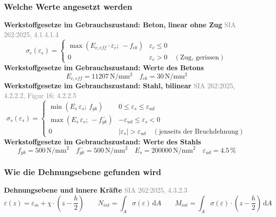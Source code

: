 \documentclass[11pt,a4paper]{article}
\newcommand{\normref}[1]{{\small\textcolor{gray}{#1}}}
\begin{document}
\subsubsection{Welche Werte angesetzt werden}
\noindent\textbf{Werkstoffgesetze im Gebrauchszustand: Beton, linear ohne Zug} \hfill \normref{SIA 262:2025, 4.1.4.1.4}
\begin{equation*}
\sigma_c(\varepsilon_c) = \begin{cases} \max\left(E_{c,eff} \cdot \varepsilon_c;\ -f_{ck}\right) & \varepsilon_c \le 0 \\[1ex] 0 & \varepsilon_c > 0 \quad (\text{Zug, gerissen}) \end{cases}
\end{equation*}
\noindent\textbf{Werkstoffgesetze im Gebrauchszustand: Werte des Betons}
\begin{equation*}
E_{c,eff} = 11207\,\mathrm{N}/\mathrm{mm}^{2} \quad f_{ck} = 30\,\mathrm{N}/\mathrm{mm}^{2}
\end{equation*}
\noindent\textbf{Werkstoffgesetze im Gebrauchszustand: Stahl, bilinear} \hfill \normref{SIA 262:2025, 4.2.2.2, Figur 16; 4.2.2.5}
\begin{equation*}
\sigma_s(\varepsilon_s) = \begin{cases} \min(E_s\,\varepsilon_s;\ f_{yk}) & 0 \le \varepsilon_s \le \varepsilon_{ud} \\[1ex] \max(E_s\,\varepsilon_s;\ -f_{yk}^{-}) & -\varepsilon_{ud} \le \varepsilon_s < 0 \\[1ex] 0 & |\varepsilon_s| > \varepsilon_{ud} \quad (\text{jenseits der Bruchdehnung}) \end{cases}
\end{equation*}
\noindent\textbf{Werkstoffgesetze im Gebrauchszustand: Werte des Stahls}
\begin{equation*}
f_{yk} = 500\,\mathrm{N}/\mathrm{mm}^{2} \quad f_{yk}^{-} = 500\,\mathrm{N}/\mathrm{mm}^{2} \quad E_s = 200000\,\mathrm{N}/\mathrm{mm}^{2} \quad \varepsilon_{ud} = 4.5\,\%
\end{equation*}
\subsubsection{Wie die Dehnungsebene gefunden wird}
\noindent\textbf{Dehnungsebene und innere Kräfte} \hfill \normref{SIA 262:2025, 4.3.2.3}
\begin{equation*}
\varepsilon(z) = \varepsilon_m + \chi \cdot \left(z - \frac{h}{2}\right) \qquad N_{int} = \int_A \sigma\left(\varepsilon\right)\,\mathrm{d}A \qquad M_{int} = \int_A \sigma\left(\varepsilon\right) \cdot \left(z - \frac{h}{2}\right)\,\mathrm{d}A
\end{equation*}
\end{document}
